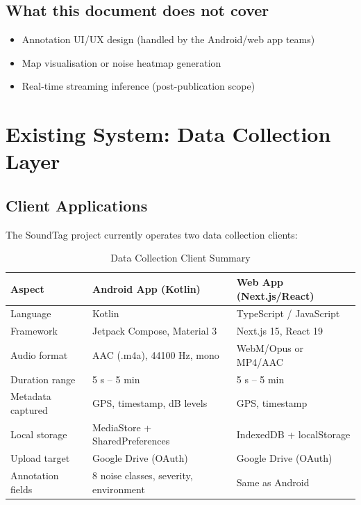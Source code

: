 \documentclass[11pt,a4paper]{article}
\begin{document}
\subsection{What this document does not cover}
\begin{itemize}[leftmargin=*,noitemsep]
  \item Annotation UI/UX design (handled by the Android/web app teams)
  \item Map visualisation or noise heatmap generation
  \item Real-time streaming inference (post-publication scope)
\end{itemize}

\section{Existing System: Data Collection Layer}

\subsection{Client Applications}

The SoundTag project currently operates two data collection clients:

\begin{table}[h]
\centering
\caption{Data Collection Client Summary}
\begin{tabular}{@{}p{3.2cm}p{5cm}p{5cm}@{}}
\toprule
\textbf{Aspect} & \textbf{Android App (Kotlin)} & \textbf{Web App (Next.js/React)} \\
\midrule
Language & Kotlin & TypeScript / JavaScript \\
Framework & Jetpack Compose, Material 3 & Next.js 15, React 19 \\
Audio format & AAC (.m4a), 44100 Hz, mono & WebM/Opus or MP4/AAC \\
Duration range & 5 s -- 5 min & 5 s -- 5 min \\
Metadata captured & GPS, timestamp, dB levels & GPS, timestamp \\
Local storage & MediaStore + SharedPreferences & IndexedDB + localStorage \\
Upload target & Google Drive (OAuth) & Google Drive (OAuth) \\
Annotation fields & 8 noise classes, severity, environment & Same as Android \\
\bottomrule
\end{tabular}
\end{table}
\end{document}
